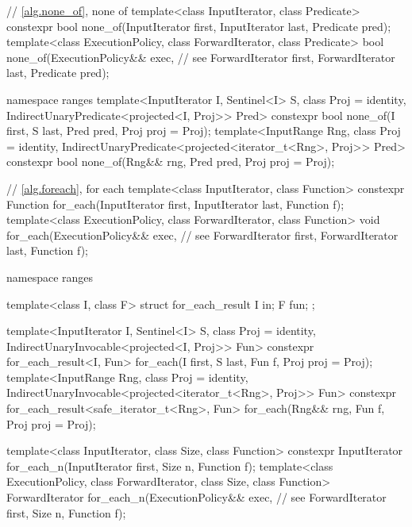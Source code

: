 \begin{codeblock}
  // \ref{alg.none_of}, none of
  template<class InputIterator, class Predicate>
    constexpr bool none_of(InputIterator first, InputIterator last, Predicate pred);
  template<class ExecutionPolicy, class ForwardIterator, class Predicate>
    bool none_of(ExecutionPolicy&& exec, // see 
                 ForwardIterator first, ForwardIterator last, Predicate pred);
\end{codeblock}\begin{addedblock}\begin{codeblock}
  namespace ranges {
    template<InputIterator I, Sentinel<I> S, class Proj = identity,
        IndirectUnaryPredicate<projected<I, Proj>> Pred>
      constexpr bool none_of(I first, S last, Pred pred, Proj proj = Proj{});
    template<InputRange Rng, class Proj = identity,
        IndirectUnaryPredicate<projected<iterator_t<Rng>, Proj>> Pred>
      constexpr bool none_of(Rng&& rng, Pred pred, Proj proj = Proj{});
  }
\end{codeblock}\end{addedblock}\begin{codeblock}

  // \ref{alg.foreach}, for each
  template<class InputIterator, class Function>
    constexpr Function for_each(InputIterator first, InputIterator last, Function f);
  template<class ExecutionPolicy, class ForwardIterator, class Function>
    void for_each(ExecutionPolicy&& exec, // see 
                  ForwardIterator first, ForwardIterator last, Function f);
\end{codeblock}\begin{addedblock}\begin{codeblock}
  namespace ranges {
    template<class I, class F>
    struct for_each_result {
      I in;
      F fun;
    };

    template<InputIterator I, Sentinel<I> S, class Proj = identity,
        IndirectUnaryInvocable<projected<I, Proj>> Fun>
      constexpr for_each_result<I, Fun>
        for_each(I first, S last, Fun f, Proj proj = Proj{});
    template<InputRange Rng, class Proj = identity,
        IndirectUnaryInvocable<projected<iterator_t<Rng>, Proj>> Fun>
      constexpr for_each_result<safe_iterator_t<Rng>, Fun>
        for_each(Rng&& rng, Fun f, Proj proj = Proj{});
  }
\end{codeblock}\end{addedblock}\begin{codeblock}
  template<class InputIterator, class Size, class Function>
    constexpr InputIterator for_each_n(InputIterator first, Size n, Function f);
  template<class ExecutionPolicy, class ForwardIterator, class Size, class Function>
    ForwardIterator for_each_n(ExecutionPolicy&& exec, // see 
                               ForwardIterator first, Size n, Function f);


\end{codeblock}
